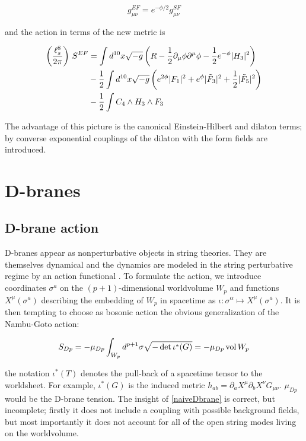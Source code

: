 \begin{equation}
	g_{\mu\nu}^{EF} = e^{-\phi/2} g_{\mu\nu}^{SF}
	\label{}
\end{equation}

and the action in terms of the new metric is \cite{BBS}

\begin{align}
\begin{split}
	\left(\frac{\ell_s^8}{2\pi}\right) \,S^{EF} &=  \int d^{10} x \sqrt{-g} \left( R - \frac{1}{2} \partial_\mu \phi \partial^\mu \phi - \frac{1}{2} e^{-\phi} |H_3|^2 \right)\\
	&- \frac{1}{2}  \int d^{10}x \sqrt{-g} \left( e^{2\phi} |F_1|^2 + e^\phi |\tilde F_3|^2 + \frac{1}{2} |\tilde F_5|^2 \right)\\
	&- \frac{1}{2}  \int C_4 \wedge H_3 \wedge F_3 
	\label{}
\end{split}
\end{align}

The advantage of this picture is the canonical Einstein-Hilbert and dilaton terms; by converse exponential couplings of the dilaton with the form fields are introduced.

\section{D-branes}

\subsection{D-brane action}\label{sec:dbraneaction}

D-branes appear as nonperturbative objects in string theories. They are themselves dynamical and the dynamics are modeled in the string perturbative regime by an action functional \cite{ibanezU}. To formulate the action, we introduce coordinates $\sigma^a$ on the $(p+1)$-dimensional worldvolume $W_p$ and functions $X^\mu(\sigma^a)$ describing the embedding of $W_p$ in spacetime as $\iota:\sigma^\alpha \mapsto X^\mu(\sigma^a)$. It is then tempting to choose as bosonic action the obvious generalization of the Nambu-Goto action:

\begin{equation}
	S_{Dp} = - \mu_{Dp} \int_{W_p} d^{p+1} \sigma \sqrt{-\det \iota^*(G)} = - \mu_{Dp} \operatorname{vol} W_p
	\label{naiveDbrane}
\end{equation}

the notation $\iota^*(T)$ denotes the pull-back of a spacetime tensor to the worldsheet. For example, $\iota^*(G)$ is the induced metric $h_{ab} = \partial_a X^\mu \partial_b X^\nu G_{\mu\nu}$. $\mu_{Dp}$ would be the D-brane tension. The insight of \eqref{naiveDbrane} is correct, but incomplete; firstly it does not include a coupling with possible background fields, but most importantly it does not account for all of the open string modes living on the worldvolume.

